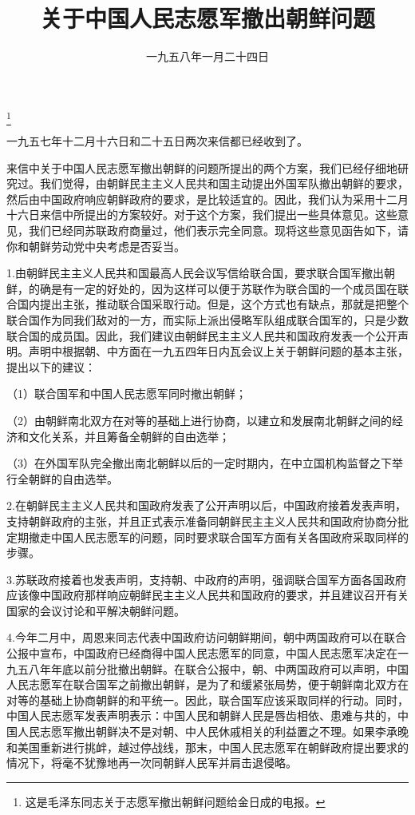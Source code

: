 
\title{关于中国人民志愿军撤出朝鲜问题}
\date{一九五八年一月二十四日}
\thanks{这是毛泽东同志关于志愿军撤出朝鲜问题给金日成的电报。}
\maketitle



一九五七年十二月十六日和二十五日两次来信都已经收到了。

来信中关于中国人民志愿军撤出朝鲜的问题所提出的两个方案，我们已经仔细地研究过。我们觉得，由朝鲜民主主义人民共和国主动提出外国军队撤出朝鲜的要求，然后由中国政府响应朝鲜政府的要求，是比较适宜的。因此，我们认为采用十二月十六日来信中所提出的方案较好。对于这个方案，我们提出一些具体意见。这些意见，我们已经同苏联政府商量过，他们表示完全同意。现将这些意见函告如下，请你和朝鲜劳动党中央考虑是否妥当。

1.由朝鲜民主主义人民共和国最高人民会议写信给联合国，要求联合国军撤出朝鲜，的确是有一定的好处的，因为这样可以便于苏联作为联合国的一个成员国在联合国内提出主张，推动联合国采取行动。但是，这个方式也有缺点，那就是把整个联合国作为同我们敌对的一方，而实际上派出侵略军队组成联合国军的，只是少数联合国的成员国。因此，我们建议由朝鲜民主主义人民共和国政府发表一个公开声明。声明中根据朝、中方面在一九五四年日内瓦会议上关于朝鲜问题的基本主张，提出以下的建议：

（1）联合国军和中国人民志愿军同时撤出朝鲜；

（2）由朝鲜南北双方在对等的基础上进行协商，以建立和发展南北朝鲜之间的经济和文化关系，并且筹备全朝鲜的自由选举；

（3）在外国军队完全撤出南北朝鲜以后的一定时期内，在中立国机构监督之下举行全朝鲜的自由选举。

2.在朝鲜民主主义人民共和国政府发表了公开声明以后，中国政府接着发表声明，支持朝鲜政府的主张，并且正式表示准备同朝鲜民主主义人民共和国政府协商分批定期撤走中国人民志愿军的问题，同时要求联合国军方面有关各国政府采取同样的步骤。

3.苏联政府接着也发表声明，支持朝、中政府的声明，强调联合国军方面各国政府应该像中国政府那样响应朝鲜民主主义人民共和国政府的要求，并且建议召开有关国家的会议讨论和平解决朝鲜问题。

4.今年二月中，周恩来同志代表中国政府访问朝鲜期间，朝中两国政府可以在联合公报中宣布，中国政府已经商得中国人民志愿军的同意，中国人民志愿军决定在一九五八年年底以前分批撤出朝鲜。在联合公报中，朝、中两国政府可以声明，中国人民志愿军在联合国军之前撤出朝鲜，是为了和缓紧张局势，便于朝鲜南北双方在对等的基础上协商朝鲜的和平统一。因此，联合国军应该采取同样的行动。同时，中国人民志愿军发表声明表示：中国人民和朝鲜人民是唇齿相依、患难与共的，中国人民志愿军撤出朝鲜决不是对朝、中人民休戚相关的利益置之不理。如果李承晚和美国重新进行挑衅，越过停战线，那末，中国人民志愿军在朝鲜政府提出要求的情况下，将毫不犹豫地再一次同朝鲜人民军并肩击退侵略。

